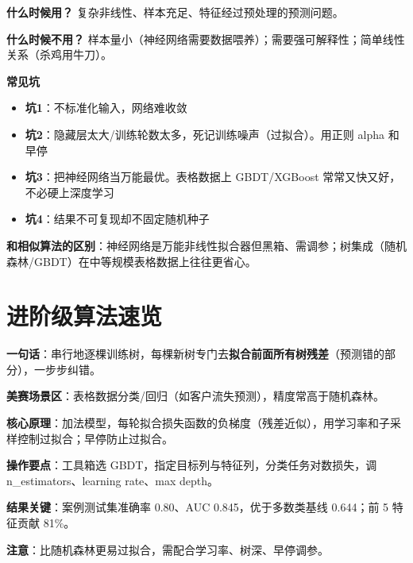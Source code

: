 \begin{algonotes}
\textbf{什么时候用？} 复杂非线性、样本充足、特征经过预处理的预测问题。

\textbf{什么时候不用？} 样本量小（神经网络需要数据喂养）；需要强可解释性；简单线性关系（杀鸡用牛刀）。

\textbf{常见坑}
\begin{itemize}
    \item \textbf{坑1}：不标准化输入，网络难收敛
    \item \textbf{坑2}：隐藏层太大/训练轮数太多，死记训练噪声（过拟合）。用正则 alpha 和早停
    \item \textbf{坑3}：把神经网络当万能最优。表格数据上 GBDT/XGBoost 常常又快又好，不必硬上深度学习
    \item \textbf{坑4}：结果不可复现却不固定随机种子
\end{itemize}

\textbf{和相似算法的区别}：神经网络是万能非线性拟合器但黑箱、需调参；树集成（随机森林/GBDT）在中等规模表格数据上往往更省心。
\end{algonotes}

\section{进阶级算法速览}


\begin{algobrief}
\textbf{一句话}：串行地逐棵训练树，每棵新树专门去\textbf{拟合前面所有树残差}（预测错的部分），一步步纠错。

\textbf{美赛场景区}：表格数据分类/回归（如客户流失预测），精度常高于随机森林。

\textbf{核心原理}：加法模型，每轮拟合损失函数的负梯度（残差近似），用学习率和子采样控制过拟合；早停防止过拟合。

\textbf{操作要点}：工具箱选 GBDT，指定目标列与特征列，分类任务对数损失，调 n\_estimators、learning rate、max depth。

\textbf{结果关键}：案例测试集准确率 0.80、AUC 0.845，优于多数类基线 0.644；前 5 特征贡献 81\%。

\textbf{注意}：比随机森林更易过拟合，需配合学习率、树深、早停调参。
\end{algobrief}


